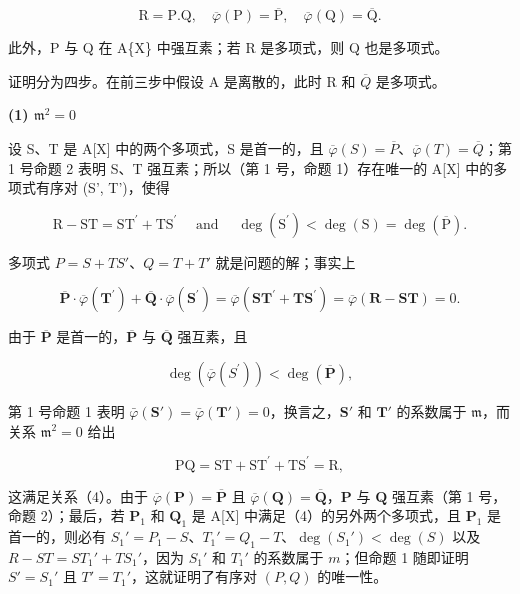 \[
\mathrm{R} = \mathrm{P}. \mathrm{Q}, \quad \overline {{{\varphi}}} (\mathrm{P}) = \overline {{{\mathrm{P}}}}, \quad \overline {{{\varphi}}} (\mathrm{Q}) = \overline {{{\mathrm{Q}}}}.\tag{4}
\]

此外，P 与 Q 在 A\{X\} 中强互素；若 R 是多项式，则 Q 也是多项式。

证明分为四步。在前三步中假设 A 是离散的，此时 R 和 \(\overline{Q}\) 是多项式。

\textbf{(1) \(\mathfrak{m}^2 = 0\)}\par

设 S、T 是 A{[}X{]} 中的两个多项式，S 是首一的，且 \(\overline{\varphi}(S) = \overline{P}\)、\(\overline{\varphi}(T) = \overline{Q}\)；第 1 号命题 2 表明 S、T 强互素；所以（第 1 号，命题 1）存在唯一的 A{[}X{]} 中的多项式有序对 (S', T')，使得

\[
\mathrm{R} - \mathrm{ST} = \mathrm{ST} ^ {\prime} + \mathrm{TS} ^ {\prime} \quad \text { and } \quad \deg (\mathrm{S} ^ {\prime}) <   \deg (\mathrm{S}) = \deg (\overline {{\mathrm{P}}}).\tag{5}
\]

多项式 \(P = S + TS'\)、\(Q = T + T'\) 就是问题的解；事实上

\[
\overline {{{\mathbf {P}}}} \cdot \overline {{{\varphi}}} (\mathbf {T} ^ {\prime}) + \overline {{{\mathbf {Q}}}} \cdot \overline {{{\varphi}}} (\mathbf {S} ^ {\prime}) = \overline {{{\varphi}}} (\mathbf {S T} ^ {\prime} + \mathbf {T S} ^ {\prime}) = \overline {{{\varphi}}} (\mathbf {R} - \mathbf {S T}) = 0.\tag{6}
\]

由于 \(\overline{\mathbf{P}}\) 是首一的，\(\overline{\mathbf{P}}\) 与 \(\overline{\mathbf{Q}}\) 强互素，且

\[
\deg (\overline {{{\varphi}}} (S ^ {\prime})) <   \deg (\overline {{{\mathbf {P}}}}),
\]

第 1 号命题 1 表明 \(\bar{\varphi}(\mathbf{S}') = \bar{\varphi}(\mathbf{T}') = 0\)，换言之，\(\mathbf{S}'\) 和 \(\mathbf{T}'\) 的系数属于 \(\mathfrak{m}\)，而关系 \(\mathfrak{m}^2 = 0\) 给出

\[
\mathrm{PQ} = \mathrm{ST} + \mathrm{ST} ^ {\prime} + \mathrm{TS} ^ {\prime} = \mathrm{R},
\]

这满足关系（4）。由于 \(\overline{\varphi}(\mathbf{P}) = \overline{\mathbf{P}}\) 且 \(\overline{\varphi}(\mathbf{Q}) = \overline{\mathbf{Q}}\)，\(\mathbf{P}\) 与 \(\mathbf{Q}\) 强互素（第 1 号，命题 2）；最后，若 \(\mathbf{P}_1\) 和 \(\mathbf{Q}_1\) 是 A{[}X{]} 中满足（4）的另外两个多项式，且 \(\mathbf{P}_1\) 是首一的，则必有 \(S_1' = P_1 - S\)、\(T_1' = Q_1 - T\)、\(\deg(S_1') < \deg(S)\) 以及 \(R - ST = ST_1' + TS_1'\)，因为 \(S_1'\) 和 \(T_1'\) 的系数属于 \(m\)；但命题 1 随即证明 \(S' = S_1'\) 且 \(T' = T_1'\)，这就证明了有序对 \((P, Q)\) 的唯一性。

